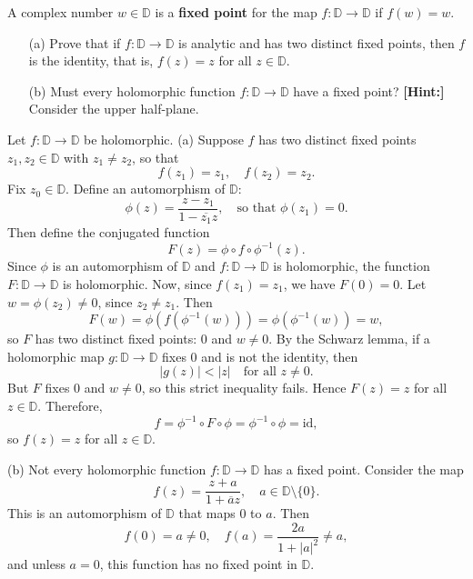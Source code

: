 \documentclass[12pt]{article}
\begin{document}
\begin{statement}[8.5.12]
    A complex number $w \in \mathbb{D}$ is a \textbf{fixed point} for the map $f : \mathbb{D} \to \mathbb{D}$ if $f(w) = w$.
    \begin{itemize}
        \item[(a)] Prove that if $f : \mathbb{D} \to \mathbb{D}$ is analytic and has two distinct fixed points, then $f$ is the identity, that is, $f(z) = z$ for all $z \in \mathbb{D}$.
    
        \item[(b)] Must every holomorphic function $f : \mathbb{D} \to \mathbb{D}$ have a fixed point? \textbf{[Hint:]} Consider the upper half-plane.
    \end{itemize}
\end{statement}
\begin{newproof}
    Let $f : \mathbb{D} \to \mathbb{D}$ be holomorphic.
    (a) Suppose $f$ has two distinct fixed points $z_1, z_2 \in \mathbb{D}$ with $z_1 \neq z_2$, so that
    $$ f(z_1) = z_1, \quad f(z_2) = z_2. $$
    Fix $z_0 \in \mathbb{D}$. Define an automorphism of $\mathbb{D}$:
    $$ \phi(z) = \frac{z - z_1}{1 - \overline{z_1} z}, \quad \text{so that } \phi(z_1) = 0. $$
    Then define the conjugated function
    $$ F(z) = \phi \circ f \circ \phi^{-1}(z). $$
    Since $\phi$ is an automorphism of $\mathbb{D}$ and $f : \mathbb{D} \to \mathbb{D}$ is holomorphic, the function $F : \mathbb{D} \to \mathbb{D}$ is holomorphic.
    Now, since $f(z_1) = z_1$, we have $F(0) = 0$. Let $w = \phi(z_2) \neq 0$, since $z_2 \neq z_1$. Then
    $$ F(w) = \phi(f(\phi^{-1}(w))) = \phi(\phi^{-1}(w)) = w, $$
    so $F$ has two distinct fixed points: $0$ and $w \neq 0$.
    By the Schwarz lemma, if a holomorphic map $g : \mathbb{D} \to \mathbb{D}$ fixes $0$ and is not the identity, then
    $$ |g(z)| < |z| \quad \text{for all } z \neq 0. $$
    But $F$ fixes $0$ and $w \neq 0$, so this strict inequality fails. Hence $F(z) = z$ for all $z \in \mathbb{D}$. Therefore,
    $$ f = \phi^{-1} \circ F \circ \phi = \phi^{-1} \circ \phi = \text{id}, $$
    so $f(z) = z$ for all $z \in \mathbb{D}$.

    (b) Not every holomorphic function $f : \mathbb{D} \to \mathbb{D}$ has a fixed point.
    Consider the map
    $$ f(z) = \frac{z + a}{1 + \overline{a}z}, \quad a \in \mathbb{D} \setminus \{0\}. $$
    This is an automorphism of $\mathbb{D}$ that maps $0$ to $a$. Then
    $$ f(0) = a \neq 0, \quad f(a) = \frac{2a}{1 + |a|^2} \neq a, $$
    and unless $a = 0$, this function has no fixed point in $\mathbb{D}$.
\end{newproof}
\end{document}

